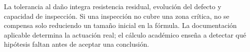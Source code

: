 La tolerancia al daño integra resistencia residual, evolución del defecto y capacidad de inspección. Si una inspección no cubre una zona crítica, no se compensa solo reduciendo un tamaño inicial en la fórmula. La documentación aplicable determina la actuación real; el cálculo académico enseña a detectar qué hipótesis faltan antes de aceptar una conclusión.
